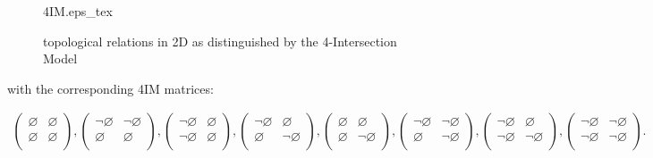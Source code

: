 \documentclass[paper=a4, fontsize=11pt]{scrartcl} %
\numberwithin{equation}{section} %
\numberwithin{figure}{section} %
\numberwithin{table}{section} %
\begin{document}
\begin{figure}[!h]
  \centering  
  \def\svgwidth{\textwidth}
  {4IM.eps_tex}
  \caption{topological relations in 2D as distinguished by the 4-Intersection Model}
  \label{fig:4im}
\end{figure}

with the corresponding 4IM matrices:

\begin{align*}
\begin{pmatrix}
    \varnothing & \varnothing \\
    \varnothing & \varnothing \\
  \end{pmatrix}, 
  \begin{pmatrix}
    \neg\varnothing & \neg\varnothing \\
    \varnothing & \varnothing \\
  \end{pmatrix}, 
  \begin{pmatrix}
    \neg\varnothing & \varnothing \\
    \neg\varnothing & \varnothing \\
  \end{pmatrix}, 
  \begin{pmatrix}
    \neg\varnothing & \varnothing \\
    \varnothing & \neg\varnothing \\
  \end{pmatrix}, 
  \begin{pmatrix}
    \varnothing & \varnothing \\
    \varnothing & \neg\varnothing \\
  \end{pmatrix}, 
  \begin{pmatrix}
    \neg\varnothing & \neg\varnothing \\
    \varnothing & \neg\varnothing \\
  \end{pmatrix}, 
  \begin{pmatrix}
    \neg\varnothing & \varnothing \\
    \neg\varnothing & \neg\varnothing \\
  \end{pmatrix}, 
  \begin{pmatrix}
    \neg\varnothing & \neg\varnothing \\
    \neg\varnothing & \neg\varnothing \\
  \end{pmatrix}. 
\end{align*}
\end{document}
